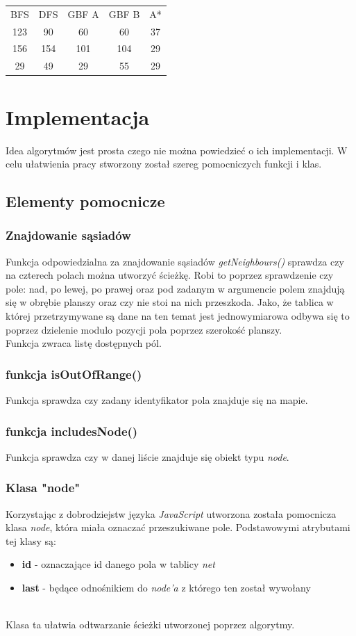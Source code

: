 \documentclass{article}
\begin{document}
\begin{center}
\begin{tabular}{c c c c c}
BFS & DFS & GBF A & GBF B & A* \\
123 & 90 & 60 & 60 & 37 \\
156 & 154 & 101 & 104 & 29\\
29 & 49 & 29 & 55 & 29\\
\end{tabular}
\end{center}

\section{Implementacja}
Idea algorytmów jest prosta czego nie można powiedzieć o ich implementacji. W celu ułatwienia pracy stworzony został szereg pomocniczych funkcji i klas. 
\subsection{Elementy pomocnicze}
\subsubsection{Znajdowanie sąsiadów}
Funkcja odpowiedzialna za znajdowanie sąsiadów \textit{getNeighbours()} sprawdza czy na czterech polach można utworzyć ścieżkę. Robi to poprzez sprawdzenie czy pole: nad, po lewej, po prawej oraz pod zadanym w argumencie polem znajdują się w obrębie planszy oraz czy nie stoi na nich przeszkoda. Jako, że tablica w której przetrzymywane są dane na ten temat jest jednowymiarowa odbywa się to poprzez dzielenie modulo pozycji pola poprzez szerokość planszy.\\
Funkcja zwraca listę dostępnych pól.
\subsubsection{funkcja isOutOfRange()}
Funkcja sprawdza czy zadany identyfikator pola znajduje się na mapie.
\subsubsection{funkcja includesNode()}
Funkcja sprawdza czy w danej liście znajduje się obiekt typu \textit{node}.

\subsubsection{Klasa "node"}
Korzystając z dobrodziejstw języka \textit{JavaScript} utworzona została pomocnicza klasa \textit{node}, która miała oznaczać przeszukiwane pole. Podstawowymi atrybutami tej klasy są:
\begin{itemize}
\item \textbf{id} - oznaczające id danego pola w tablicy \textit{net}
\item \textbf{last} - będące odnośnikiem do \textit{node'a} z którego ten został wywołany
\end{itemize}\\
Klasa ta ułatwia odtwarzanie ścieżki utworzonej poprzez algorytmy.
\end{document}
